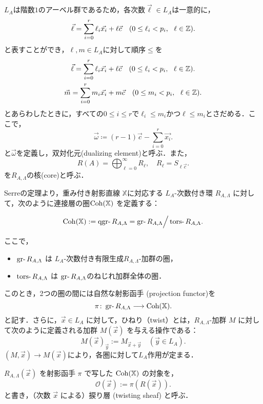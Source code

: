 $L_A$は階数$1$のアーベル群であるため，各次数$\vec{\ell}\in L_A$は一意的に，
\[\vec{\ell} = \sum_{i=0}^r \ell_i\vec{x_i} + \ell\vec{c}\quad (0\le \ell_i < p_i,\ \ \ell \in {\mathbb Z}).\]
と表すことができ，$\ell,m\in L_A$に対して順序$\le$を
\begin{gather*}
\vec{\ell} = \sum_{i=0}^r \ell_i\vec{x_i} + \ell\vec{c}\quad (0\le \ell_i < p_i,\ \ \ell \in \ZZ).\\
\vec{m} = \sum_{i=0}^r m_i\vec{x_i} + m\vec{c}\quad (0\le m_i < p_i,\ \ \ell \in \ZZ).
\end{gather*}
とあらわしたときに，すべての$0\le i\le r$で$\ell_i\le m_i$かつ$\ell\le m_i$とさだめる．ここで，
\[\vec{\omega} \coloneq (r-1)\vec{c} - \sum_{i=0}^r\vec{x_i}.\]
と$\vec{\omega}$を定義し，双対化元(dualizing element)と呼ぶ．また，
\[R(A)= \bigoplus_{\ell=0}^\infty R_{\ell},\quad R_\ell = S_{\ell\vec{c}}.\]
を$R_{A,\Lambda}$の核(core)と呼ぶ．

\begin{defn}\cite{GL87}
	Serreの定理より，重み付き射影直線 $\mathbb{X}$に対応する $L_A$-次数付き環 $R_{A,\Lambda}$ に対して，次のように連接層の圏$\operatorname{\mathrm{Coh}}(\mathbb{X})$ を定義する：

\[
\Coh(\mathbb{X}) := \qgr R_{A,\Lambda} = \gr R_{A,\Lambda}\Big{/}\tors R_{A,\Lambda}.
\]

ここで，
\begin{itemize}
	\item $\gr R_{A,\Lambda}$ は $L_A$-次数付き有限生成$R_{A,\Lambda}$-加群の圏，
	\item $\tors R_{A,\Lambda}$ は $\gr R_{A,\Lambda}$のねじれ加群全体の圏．
\end{itemize}
このとき，2つの圏の間には自然な射影函手 (projection functor)を
\[ \pi\colon \gr R_{A,\Lambda} \longrightarrow \Coh(\XX) .\]
と記す．さらに，$\vec{x} \in L_A$ に対して，ひねり（twist）とは，$R_{A,\Lambda}$-加群 $M$ に対して次のように定義される加群 $M(\vec{x})$ を与える操作である：
\[
M(\vec{x})_{\vec{y}} := M_{\vec{x} + \vec{y}} \quad (\vec{y} \in L_A).
\]
$(M,\vec{x})\to M(\vec{x})$により，各圏に対して$L_A$作用が定まる．
\end{defn}
$R_{A,\Lambda}(\vec{x})$ を射影函手 $\pi$ で写した $\operatorname{\mathrm{Coh}}({\mathbb X})$ の対象を，
\[ \mathcal{O}(\vec{x}) := \pi(R(\vec{x})). \]
と書き，（次数 $\vec{x}$ による）捩り層 (twisting sheaf) と呼ぶ．


